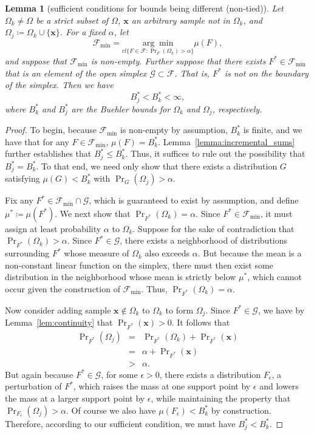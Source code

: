 \documentclass{article}
\newtheorem{lemma}[theorem]{Lemma}
\theoremstyle{definition}
\theoremstyle{remark}
\newcounter{assumption}%
\def\x{\mathbf{x}}
\begin{document}
\begin{lemma}[sufficient conditions for bounds being different (non-tied)]
\label{lem:suff_cond_no_tie}
    Let $\Omega_k\neq \Omega$ be a strict subset of $\Omega$, $\x$ an arbitrary sample not in $\Omega_k$, and $\Omega_j \coloneqq \Omega_k \cup \{\x\}$. For a fixed $\alpha$, let 
    $$
     \mathcal{F}_{\min} =\underset{cl\{F \in \mathcal{F}: \Pr\nolimits_F(\Omega_k) > \alpha\}}{\arg \min} \mu(F),
    $$
    and suppose that $\mathcal{F}_{\min}$ is non-empty.
    Further suppose that there exists $F^* \in \mathcal{F}_{\min}$ that is an element of the open simplex $\mathcal{G}\subset \mathcal{F}$. That is, $F^*$ is not on the boundary of the simplex. Then we have
    $$
        B^*_j < B^*_k < \infty,
    $$
    where $B^*_k$ and $B^*_j$ are the Buehler bounds for $\Omega_k$ and $\Omega_j$, respectively.
\end{lemma}
\begin{proof} To begin, because $\mathcal{F}_{\min}$ is non-empty by assumption, $B^*_k$ is finite, and we have that for any $F \in \mathcal{F}_{\min}$, $\mu(F) = B^*_k$. 
Lemma~\ref{lemma:incremental_sums} further establishes that $B^*_j \leq B^*_k$. Thus, it suffices to rule out the possibility that $B^*_j = B^*_k$. To that end, we need only show that there exists a distribution $G$ satisfying $\mu(G) < B^*_k$ with $\Pr_G(\Omega_j) > \alpha$.

Fix any $F^* \in \mathcal{F}_{\min} \cap \mathcal{G}$, which is guaranteed to exist by assumption, and define $\mu^* \coloneqq \mu(F^*)$. 
We next show that $\Pr_{F^*}(\Omega_k) = \alpha$. Since $F^* \in \mathcal{F}_{\min}$, it must assign at least probability $\alpha$ to $\Omega_k$. Suppose for the sake of contradiction that $\Pr_{F^*}(\Omega_k) > \alpha$. Since $F^* 
\in \mathcal{G}$, there exists a neighborhood of distributions surrounding $F^*$ whose measure of $\Omega_k$ also exceeds $\alpha$. But because the mean is a non-constant linear function on the simplex, there must then exist some distribution in the neighborhood whose mean is strictly below $\mu^*$, which cannot occur given the construction of $\mathcal{F}_{\min}$. Thus, $\Pr_{F^*}(\Omega_k) = \alpha$.

Now consider adding sample $\x \not \in \Omega_k$ to $\Omega_k$ to form $\Omega_j$. Since $F^* \in \mathcal{G}$, we have by Lemma~\ref{lem:continuity} that $\Pr_{F^*}(\x) > 0$. It follows that
\begin{eqnarray*}
    \Pr\nolimits_{F^*}(\Omega_j) &=& \Pr\nolimits_{F^*}(\Omega_k) + \Pr\nolimits_{F^*}(\x) \\
    &=& \alpha + \Pr\nolimits_{F^*}(\x) \\
    &>& \alpha.
\end{eqnarray*}
But again because $F^* \in \mathcal{G}$, for some $\epsilon > 0$, there exists a distribution $F_\epsilon$, a perturbation of $F^*$, which raises the mass at one support point by $\epsilon$ and lowers the mass at a larger support point by $\epsilon$, while maintaining the property that $\Pr_{F_\epsilon}(\Omega_j) > \alpha$. Of course we also have $\mu(F_\epsilon) < B^*_k$ by construction. Therefore, according to our sufficient condition, we must have $B^*_j < B^*_k$.
\end{proof}
\end{document}
